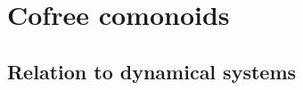 \documentclass[DynamicalBook]{subfiles}
\begin{document}
%
%

\section{Cofree comonoids}

\subsection{Relation to dynamical systems}
\end{document}
